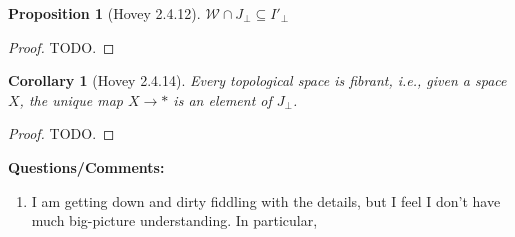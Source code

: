 \documentclass{amsart}
\theoremstyle{plain}
\newtheorem{corollary}[theorem]{Corollary}
\newtheorem{proposition}[theorem]{Proposition}
\theoremstyle{definition}
\newcommand{\sseq}{\subseteq}
\newcommand{\0}{\mathbf{0}}
\newcommand{\p}{{_\perp}}
\newcommand{\cW}{\mathcal W}
\renewcommand{\(}{\left(}
\renewcommand{\)}{\right)}
\begin{document}
\begin{proposition}[Hovey 2.4.12]\label{2.4.12}
  $\cW\cap J\p\sseq I'\p $
\end{proposition}
\begin{proof}
  \color{red}TODO.
\end{proof}

\begin{corollary}[Hovey 2.4.14]\label{2.4.14}
  Every topological space is fibrant, i.e., given a space $X$, the unique map $X\to\ast$ is an element of $J\p$.
\end{corollary}
\begin{proof}
  \color{red}TODO.
\end{proof}

\textbf{Questions/Comments:}\begin{enumerate}
  \item I am getting down and dirty fiddling with the details, but I feel I don't have much big-picture understanding. In particular, 
\end{enumerate}
\end{document}

